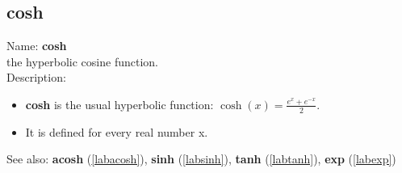 \subsection{cosh}
\label{labcosh}
\noindent Name: \textbf{cosh}\\
the hyperbolic cosine function.\\
\noindent Description: \begin{itemize}

\item \textbf{cosh} is the usual hyperbolic function: $\cosh(x) = \frac{e^x + e^{-x}}{2}$.

\item It is defined for every real number x.
\end{itemize}
See also: \textbf{acosh} (\ref{labacosh}), \textbf{sinh} (\ref{labsinh}), \textbf{tanh} (\ref{labtanh}), \textbf{exp} (\ref{labexp})
